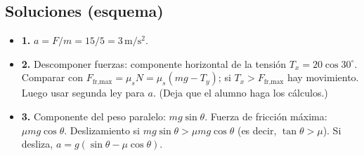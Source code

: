 \subsection*{Soluciones (esquema)}
\begin{itemize}
\item \textbf{1.} $a = F/m = 15/5 = 3\,\mathrm{m/s^2}$.
\item \textbf{2.} Descomponer fuerzas: componente horizontal de la tensión $T_x = 20\cos30^\circ$. Comparar con $F_{\text{fr,max}} = \mu_s N = \mu_s(mg - T_y)$; si $T_x > F_{\text{fr,max}}$ hay movimiento. Luego usar segunda ley para $a$. (Deja que el alumno haga los cálculos.)
\item \textbf{3.} Componente del peso paralelo: $mg\sin\theta$. Fuerza de fricción máxima: $\mu mg\cos\theta$. Deslizamiento si $mg\sin\theta > \mu mg\cos\theta$ (es decir, $\tan\theta > \mu$). Si desliza, $a = g(\sin\theta - \mu\cos\theta)$.
\end{itemize}


